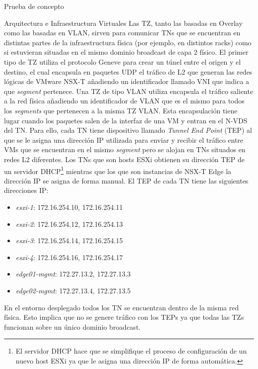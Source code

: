 \begin{section}{Prueba de concepto}
\begin{subsection}{Arquitectura e Infraestructura Virtuales\cite{CFVirtInfraes}}
Las TZ, tanto las basadas en Overlay como las basadas en VLAN, sirven para comunicar TNs que se encuentran en distintas partes de la infraestructura física (por ejemplo, en distintos racks) como si estuvieran situadas en el mismo dominio broadcast de capa 2 físico. El primer tipo de TZ utiliza el protocolo Geneve para crear un túnel entre el origen y el destino, el cual encapsula en paquetes UDP el tráfico de L2 que generan las redes lógicas de VMware NSX-T añadiendo un identificador llamado VNI que indica a que \textit{segment} pertenece. Una TZ de tipo VLAN utiliza encapsula el tráfico saliente a la red física añadiendo un identificador de VLAN que es el mismo para todos los \textit{segments} que pertenecen a la misma TZ VLAN. 
Esta encapsulación tiene lugar cuando los paquetes salen de la interfaz de una VM y entran en el N-VDS del TN. Para ello, cada TN tiene dispositivo llamado \textit{Tunnel End Point} (TEP) al que se le asigna una dirección IP utilizada para enviar y recibir el tráfico entre VMs que se encuentran en el mismo \textit{segment} pero se alojan en TNs situados en redes L2 diferentes. Los TNs que son hosts ESXi obtienen su dirección TEP de un servidor DHCP\footnote{El servidor DHCP hace que se simplifique el proceso de configuración de un nuevo host ESXi ya que le asigna una dirección IP de forma automática.} mientras que los que son instancias de NSX-T Edge la dirección IP se asigna de forma manual. El TEP de cada TN tiene las siguientes direcciones IP:
\begin{itemize}
  \item \textit{esxi-1}: 172.16.254.10, 172.16.254.11 
  \item \textit{esxi-2}: 172.16.254.12, 172.16.254.13
  \item \textit{esxi-3}: 172.16.254.14, 172.16.254.15
  \item \textit{esxi-4}: 172.16.254.16, 172.16.254.17
  \item \textit{edge01-mgmt}: 172.27.13.2, 172.27.13.3
  \item \textit{edge02-mgmt}: 172.27.13.4, 172.27.13.5
\end{itemize}
En el entorno desplegado todos los TN se encuentran dentro de la misma red física. Esto implica que no se genere tráfico con los TEPs ya que todas las TZs funcionan sobre un único dominio broadcast.


\end{subsection}
\end{section}
